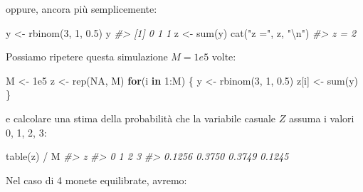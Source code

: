 \documentclass[
  11pt,
]{krantz}
\makeatletter
\newenvironment{Shaded}{\begin{snugshade}}{\end{snugshade}}
\newcommand{\CommentTok}[1]{\textcolor[rgb]{0.37,0.37,0.37}{\textit{#1}}}
\newcommand{\ConstantTok}[1]{\textcolor[rgb]{0,0,0}{#1}}
\newcommand{\ControlFlowTok}[1]{\textcolor[rgb]{0.27,0.27,0.27}{\textbf{#1}}}
\newcommand{\DecValTok}[1]{\textcolor[rgb]{0.06,0.06,0.06}{#1}}
\newcommand{\FloatTok}[1]{\textcolor[rgb]{0.06,0.06,0.06}{#1}}
\newcommand{\FunctionTok}[1]{\textcolor[rgb]{0,0,0}{#1}}
\newcommand{\NormalTok}[1]{#1}
\newcommand{\OtherTok}[1]{\textcolor[rgb]{0.37,0.37,0.37}{#1}}
\newcommand{\SpecialCharTok}[1]{\textcolor[rgb]{0,0,0}{#1}}
\newcommand{\StringTok}[1]{\textcolor[rgb]{0.5,0.5,0.5}{#1}}
\newenvironment{kframe}{%
\medskip{}
\setlength{\fboxsep}{.8em}
 \def\at@end@of@kframe{}%
 \ifinner\ifhmode%
  \def\at@end@of@kframe{\end{minipage}}%
  \begin{minipage}{\columnwidth}%
 \fi\fi%
 \def\FrameCommand##1{\hskip\@totalleftmargin \hskip-\fboxsep
 \colorbox{shadecolor}{##1}\hskip-\fboxsep
     \hskip-\linewidth \hskip-\@totalleftmargin \hskip\columnwidth}%
 \MakeFramed {\advance\hsize-\width
   \@totalleftmargin\z@ \linewidth\hsize
   \@setminipage}}%
 {\par\unskip\endMakeFramed%
 \at@end@of@kframe}
\renewenvironment{Shaded}{\begin{kframe}}{\end{kframe}}
\theoremstyle{definition}
\theoremstyle{definition}
\theoremstyle{definition}
\theoremstyle{definition}
\theoremstyle{remark}
\makeatother
\begin{document}
\noindent oppure, ancora più semplicemente:

\begin{Shaded}
\begin{Highlighting}[]
\NormalTok{y }\OtherTok{\textless{}{-}} \FunctionTok{rbinom}\NormalTok{(}\DecValTok{3}\NormalTok{, }\DecValTok{1}\NormalTok{, }\FloatTok{0.5}\NormalTok{)}
\NormalTok{y}
\CommentTok{\#\textgreater{} [1] 0 1 1}
\NormalTok{z }\OtherTok{\textless{}{-}} \FunctionTok{sum}\NormalTok{(y)}
\FunctionTok{cat}\NormalTok{(}\StringTok{"z ="}\NormalTok{, z, }\StringTok{"}\SpecialCharTok{\textbackslash{}n}\StringTok{"}\NormalTok{)}
\CommentTok{\#\textgreater{} z = 2}
\end{Highlighting}
\end{Shaded}

\noindent Possiamo ripetere questa simulazione \(M = 1e5\) volte:

\begin{Shaded}
\begin{Highlighting}[]
\NormalTok{M }\OtherTok{\textless{}{-}} \FloatTok{1e5}
\NormalTok{z }\OtherTok{\textless{}{-}} \FunctionTok{rep}\NormalTok{(}\ConstantTok{NA}\NormalTok{, M)}
\ControlFlowTok{for}\NormalTok{(i }\ControlFlowTok{in} \DecValTok{1}\SpecialCharTok{:}\NormalTok{M) \{}
\NormalTok{  y }\OtherTok{\textless{}{-}} \FunctionTok{rbinom}\NormalTok{(}\DecValTok{3}\NormalTok{, }\DecValTok{1}\NormalTok{, }\FloatTok{0.5}\NormalTok{)}
\NormalTok{  z[i] }\OtherTok{\textless{}{-}} \FunctionTok{sum}\NormalTok{(y)}
\NormalTok{\}}
\end{Highlighting}
\end{Shaded}

\noindent e calcolare una stima della probabilità che la variabile casuale \(Z\) assuma i valori 0, 1, 2, 3:

\begin{Shaded}
\begin{Highlighting}[]
\FunctionTok{table}\NormalTok{(z) }\SpecialCharTok{/}\NormalTok{ M}
\CommentTok{\#\textgreater{} z}
\CommentTok{\#\textgreater{}      0      1      2      3 }
\CommentTok{\#\textgreater{} 0.1256 0.3750 0.3749 0.1245}
\end{Highlighting}
\end{Shaded}

Nel caso di 4 monete equilibrate, avremo:
\end{document}
